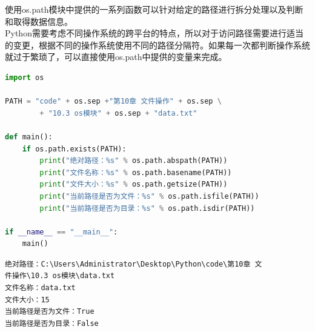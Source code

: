 使用os.path模块中提供的一系列函数可以针对给定的路径进行拆分处理以及判断和取得数据信息。\\

Python需要考虑不同操作系统的跨平台的特点，所以对于访问路径需要进行适当的变更，根据不同的操作系统使用不同的路径分隔符。如果每一次都判断操作系统就过于繁琐了，可以直接使用os.path中提供的变量来完成。

\begin{table}[H]
	\centering
	\caption{路径分隔符}
\end{table}

\vspace{0.5cm}


\begin{lstlisting}[language=Python]
import os

PATH = "code" + os.sep +"第10章 文件操作" + os.sep \
        + "10.3 os模块" + os.sep + "data.txt"

def main():
    if os.path.exists(PATH):
        print("绝对路径：%s" % os.path.abspath(PATH))
        print("文件名称：%s" % os.path.basename(PATH))
        print("文件大小：%s" % os.path.getsize(PATH))
        print("当前路径是否为文件：%s" % os.path.isfile(PATH))
        print("当前路径是否为目录：%s" % os.path.isdir(PATH))

if __name__ == "__main__":
    main()
\end{lstlisting}

\begin{tcolorbox}
	\begin{verbatim}
绝对路径：C:\Users\Administrator\Desktop\Python\code\第10章 文
件操作\10.3 os模块\data.txt
文件名称：data.txt
文件大小：15
当前路径是否为文件：True
当前路径是否为目录：False
\end{verbatim}
\end{tcolorbox}

